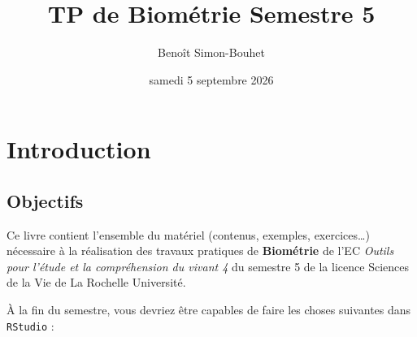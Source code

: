 \documentclass[
  french,
  a4paper,
  DIV=11,
  numbers=noendperiod,
  oneside]{scrreprt}
\title{TP de Biométrie Semestre 5}
\author{Benoît Simon-Bouhet}
\date{samedi 5 septembre 2026}
\renewcommand*\contentsname{Table des matières}
\newcommand\contentsname{Table des matières}
\begin{document}
\maketitle

\renewcommand*\contentsname{Table des matières}
{
\setcounter{tocdepth}{2}
\tableofcontents
}


\chapter*{Introduction}\label{introduction}


\section*{Objectifs}\label{objectifs}


Ce livre contient l'ensemble du matériel (contenus, exemples,
exercices\ldots) nécessaire à la réalisation des travaux pratiques de
\textbf{Biométrie} de l'EC \emph{Outils pour l'étude et la compréhension
du vivant 4} du semestre 5 de la licence Sciences de la Vie de La
Rochelle Université.

À la fin du semestre, vous devriez être capables de faire les choses
suivantes dans \texttt{RStudio} :
\end{document}
